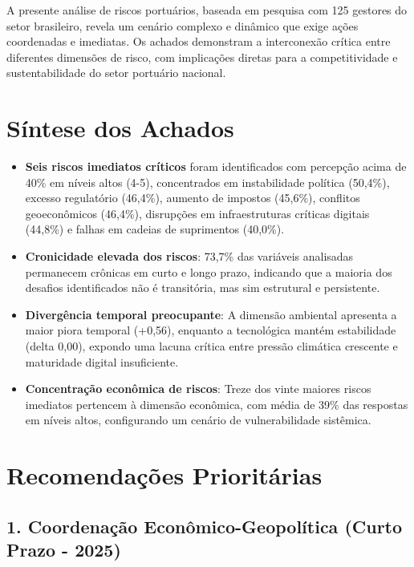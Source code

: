 \documentclass[
  portuguese,
  letterpaper,
  DIV=11,
  numbers=noendperiod]{scrreprt}
\begin{document}
A presente análise de riscos portuários, baseada em pesquisa com 125
gestores do setor brasileiro, revela um cenário complexo e dinâmico que
exige ações coordenadas e imediatas. Os achados demonstram a
interconexão crítica entre diferentes dimensões de risco, com
implicações diretas para a competitividade e sustentabilidade do setor
portuário nacional.

\section{Síntese dos Achados}\label{suxedntese-dos-achados}

\begin{itemize}
\item
  \textbf{Seis riscos imediatos críticos} foram identificados com
  percepção acima de 40\% em níveis altos (4-5), concentrados em
  instabilidade política (50,4\%), excesso regulatório (46,4\%), aumento
  de impostos (45,6\%), conflitos geoeconômicos (46,4\%), disrupções em
  infraestruturas críticas digitais (44,8\%) e falhas em cadeias de
  suprimentos (40,0\%).
\item
  \textbf{Cronicidade elevada dos riscos}: 73,7\% das variáveis
  analisadas permanecem crônicas em curto e longo prazo, indicando que a
  maioria dos desafios identificados não é transitória, mas sim
  estrutural e persistente.
\item
  \textbf{Divergência temporal preocupante}: A dimensão ambiental
  apresenta a maior piora temporal (+0,56), enquanto a tecnológica
  mantém estabilidade (delta 0,00), expondo uma lacuna crítica entre
  pressão climática crescente e maturidade digital insuficiente.
\item
  \textbf{Concentração econômica de riscos}: Treze dos vinte maiores
  riscos imediatos pertencem à dimensão econômica, com média de 39\% das
  respostas em níveis altos, configurando um cenário de vulnerabilidade
  sistêmica.
\end{itemize}

\section{Recomendações
Prioritárias}\label{recomendauxe7uxf5es-priorituxe1rias}

\subsection{1. Coordenação Econômico-Geopolítica (Curto Prazo -
2025)}\label{coordenauxe7uxe3o-econuxf4mico-geopoluxedtica-curto-prazo---2025}
\end{document}
